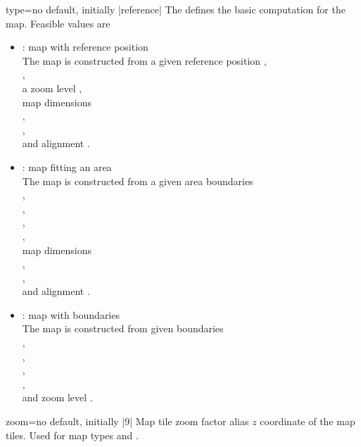 \begin{docMrcKey}[supply]{type}{=}{no default, initially |reference|}
  The  defines the basic computation for the map. Feasible values are
  \begin{itemize}
  \item{}: \flqq map with reference position\frqq\\
    The map is constructed from a given reference position
    ,\\
    ,\\
    a zoom level ,\\
    map dimensions\\
    ,\\
    ,\\
    and alignment .
  \item{}: \flqq map fitting an area\frqq\\
    The map is constructed from a given area boundaries\\
    ,\\
    ,\\
    ,\\
    ,\\
    map dimensions\\
    ,\\
    ,\\
    and alignment .
  \item{}: \flqq map with boundaries\frqq\\
    The map is constructed from given boundaries\\
    ,\\
    ,\\
    ,\\
    ,\\
    and zoom level .
  \end{itemize}
\end{docMrcKey}

\begin{docMrcKey}[supply]{zoom}{=}{no default, initially |9|}
  Map tile zoom factor alias $z$ coordinate of the map tiles.
  Used for map types  and .
\end{docMrcKey}

